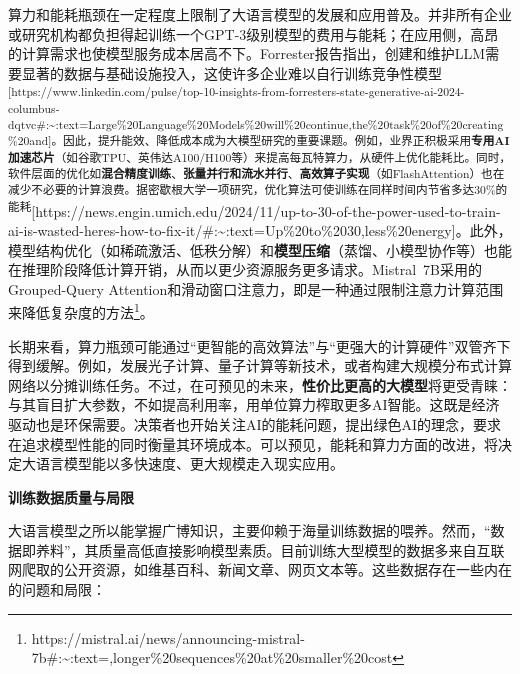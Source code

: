 \documentclass[
  letterpaper,
]{scrbook}
\begin{document}
算力和能耗瓶颈在一定程度上限制了大语言模型的发展和应用普及。并非所有企业或研究机构都负担得起训练一个GPT-3级别模型的费用与能耗；在应用侧，高昂的计算需求也使模型服务成本居高不下。Forrester报告指出，创建和维护LLM需要显著的数据与基础设施投入，这使许多企业难以自行训练竞争性模型\textsuperscript{{[}https://www.linkedin.com/pulse/top-10-insights-from-forresters-state-generative-ai-2024-columbus-dqtvc\#:\textasciitilde:text=Large\%20Language\%20Models\%20will\%20continue,the\%20task\%20of\%20creating\%20and{]}。因此，提升能效、降低成本成为大模型研究的重要课题。例如，业界正积极采用\textbf{专用AI加速芯片}（如谷歌TPU、英伟达A100/H100等）来提高每瓦特算力，从硬件上优化能耗比。同时，软件层面的优化如\textbf{混合精度训练}、\textbf{张量并行和流水并行}、\textbf{高效算子实现}（如FlashAttention）也在减少不必要的计算浪费。据密歇根大学一项研究，优化算法可使训练在同样时间内节省多达30\%的能耗}{[}https://news.engin.umich.edu/2024/11/up-to-30-of-the-power-used-to-train-ai-is-wasted-heres-how-to-fix-it/\#:\textasciitilde:text=Up\%20to\%2030,less\%20energy{]}。此外，模型结构优化（如稀疏激活、低秩分解）和\textbf{模型压缩}（蒸馏、小模型协作等）也能在推理阶段降低计算开销，从而以更少资源服务更多请求。Mistral~7B采用的Grouped-Query
Attention和滑动窗口注意力，即是一种通过限制注意力计算范围来降低复杂度的方法\footnote{https://mistral.ai/news/announcing-mistral-7b\#:\textasciitilde:text=,longer\%20sequences\%20at\%20smaller\%20cost}。

长期来看，算力瓶颈可能通过``更智能的高效算法''与``更强大的计算硬件''双管齐下得到缓解。例如，发展光子计算、量子计算等新技术，或者构建大规模分布式计算网络以分摊训练任务。不过，在可预见的未来，\textbf{性价比更高的大模型}将更受青睐：与其盲目扩大参数，不如提高利用率，用单位算力榨取更多AI智能。这既是经济驱动也是环保需要。决策者也开始关注AI的能耗问题，提出绿色AI的理念，要求在追求模型性能的同时衡量其环境成本。可以预见，能耗和算力方面的改进，将决定大语言模型能以多快速度、更大规模走入现实应用。

\textbf{训练数据质量与局限}

大语言模型之所以能掌握广博知识，主要仰赖于海量训练数据的喂养。然而，``数据即养料''，其质量高低直接影响模型素质。目前训练大型模型的数据多来自互联网爬取的公开资源，如维基百科、新闻文章、网页文本等。这些数据存在一些内在的问题和局限：
\end{document}
